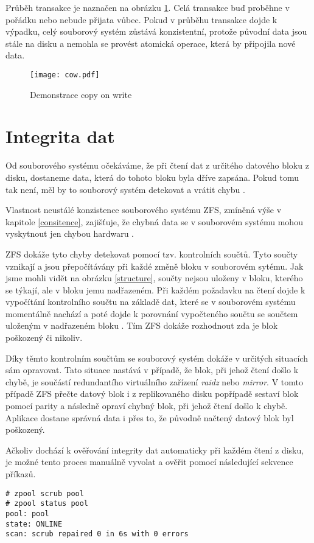 Průběh transakce je naznačen na obrázku \ref{cow}. Celá transakce buď proběhne v pořádku nebo nebude přijata vůbec. Pokud v průběhu transakce dojde k výpadku, celý souborový systém zůstává konzistentní, protože původní data jsou stále na disku a nemohla se provést atomická operace, která by připojila nové data.
\begin{figure}[h]
    \caption{Demonstrace copy on write}
    \label{cow}
    \texttt{[image: cow.pdf]}
\end{figure}
\section{Integrita dat}
\label{checksum}
Od souborového systému očekáváme, že při čtení dat z určitého datového bloku z disku, dostaneme data, která do tohoto bloku byla dříve zapsána. Pokud tomu tak není, měl by to souborový systém detekovat a vrátit chybu \cite{integrity1}.

Vlastnost neustálé konzistence souborového systému ZFS, zmíněná výše v kapitole \ref{consitence}, zajišťuje, že chybná data se v souborovém systému mohou vyskytnout jen chybou hardwaru \cite{integrity2}.

ZFS dokáže tyto chyby detekovat pomocí tzv. kontrolních součtů. Tyto součty vznikají a jsou přepočítávány při každé změně bloku v souborovém sytému. Jak jsme mohli vidět na obrázku \ref{structure}, součty nejsou uloženy v bloku, kterého se týkají, ale v bloku jemu nadřazeném. Při každém požadavku na čtení dojde k vypočítání kontrolního součtu na základě dat, které se v souborovém systému momentálně nachází a poté dojde k porovnání vypočteného součtu se součtem uloženým v nadřazeném bloku \cite{integrity1}. Tím ZFS dokáže rozhodnout zda je blok poškozený či nikoliv.

Díky těmto kontrolním součtům se souborový systém dokáže v určitých situacích sám opravovat. Tato situace nastává v případě, že blok, při jehož čtení došlo k chybě, je součástí redundantího virtuálního zařízení \emph{raidz} nebo \emph{mirror}. V tomto případě ZFS přečte datový blok i z replikovaného disku popřípadě sestaví blok pomocí parity a následně opraví chybný blok, při jehož čtení došlo k chybě. Aplikace dostane správná data i přes to, že původně načtený datový blok byl poškozený.

Ačkoliv dochází k ověřování integrity dat automaticky při každém čtení z disku, je možné tento proces manuálně vyvolat a ověřit pomocí následující sekvence příkazů.
\begin{verbatim}
# zpool scrub pool
# zpool status pool
pool: pool
state: ONLINE
scan: scrub repaired 0 in 6s with 0 errors
\end{verbatim}

